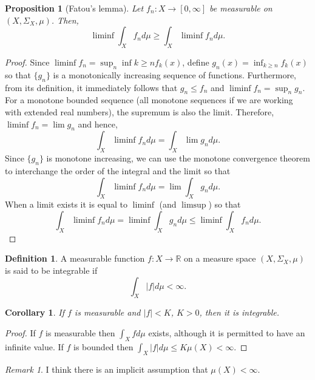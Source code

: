 \documentclass{article}
\newcommand{\sor}{\mathbb{R}}
\theoremstyle{plain}
\numberwithin{thm}{section}
\theoremstyle{plain}
\newtheorem{prop}{Proposition}
\numberwithin{prop}{section}
\theoremstyle{definition}
\newtheorem{defn}{Definition}
\numberwithin{defn}{section}
\theoremstyle{remark}
\newtheorem*{rem}{Remark}
\theoremstyle{plain}
\newtheorem{cor}{Corollary}
\numberwithin{cor}{section}
\numberwithin{equation}{section}
\begin{document}
\begin{prop}[Fatou's lemma]\label{s4p3} Let $f_n: X \rightarrow [0, \infty]$ 
be measurable on $(X, \Sigma_X, \mu)$. Then,
\[
\liminf\int_X f_n d\mu \ge \int_X\liminf f_n d\mu.
\]
\end{prop}
\begin{proof}
Since $\liminf f_n = \sup_n\inf{k \ge n} f_k(x)$, define $g_n(x) = \inf_{k \ge n}
f_k(x)$ so that $\{g_n\}$ is a monotonically increasing sequence of functions. 
Furthermore, from its definition, it immediately follows that $g_n \le f_n$ and
$\liminf f_n = \sup_n g_n$. For a monotone bounded sequence (all monotone sequences
if we are working with extended real numbers), the supremum is also the limit.
Therefore, $\liminf f_n = \lim g_n$ and hence,
\[
\int_X\liminf f_n d\mu = \int_X\lim g_n d\mu.
\]
Since $\{g_n\}$ is monotone increasing, we can use the monotone convergence theorem
to interchange the order of the integral and the limit so that
\[
\int_X\liminf f_n d\mu = \lim\int_X g_n d\mu.
\]
When a limit exists it is equal to $\liminf$ (and $\limsup$) so that
\[
\int_X\liminf f_n d\mu = \liminf\int_X g_n d\mu \le \liminf\int_X f_n d\mu.
\]
\end{proof}

\begin{defn}\label{s4d1}
A measurable function $f: X \rightarrow \sor$ on a measure space $(X, \Sigma_X, \mu)$
is said to be integrable if
\[
\int_X|f|d\mu < \infty.
\]
\end{defn}

\begin{cor}\label{s4c2}
If $f$ is measurable and $|f| < K$, $K > 0$, then it is integrable.
\end{cor}
\begin{proof}
If $f$ is measurable then $\int_X fd\mu$ exists, although it is permitted to have
an infinite value. If $f$ is bounded then $\int_X |f| d\mu \le K\mu(X) < \infty$.
\end{proof}
\begin{rem}
I think there is an implicit assumption that $\mu(X) < \infty$.
\end{rem}
\end{document}
